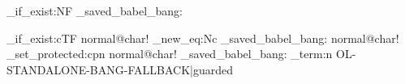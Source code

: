 \ExplSyntaxOn
\cs_if_exist:NF \olsa_saved_babel_bang:
 {
  \cs_if_exist:cTF {normal@char!}
   {
    \cs_new_eq:Nc \olsa_saved_babel_bang: {normal@char!}
    \cs_set_protected:cpn {normal@char!} {\relax\olsa_saved_babel_bang:}
    \iow_term:n {OL-STANDALONE-BANG-FALLBACK|guarded}
   }
   {\PackageError{standalone-runtime}{Expected~Babel~bang~fallback~missing}{Review~the~loaded~Babel~and~OpenLogic~versions.}}
 }
\ExplSyntaxOff

\renewcommand*{\crefpairconjunction}{ و }
\renewcommand*{\crefmiddleconjunction}{، }
\renewcommand*{\creflastconjunction}{ و }
\renewcommand*{\crefrangeconjunction}{ تا }
\renewcommand*{\crefpairgroupconjunction}{ و }
\renewcommand*{\crefmiddlegroupconjunction}{، }
\renewcommand*{\creflastgroupconjunction}{ و }
